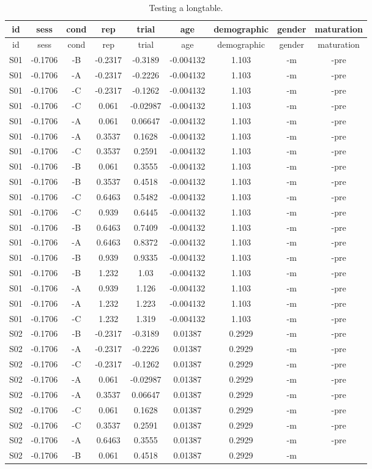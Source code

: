 \documentclass[man,longtable,noextraspace,floatsintext]{apa6}
\begin{document}
\begin{longtable}[]{@{}ccccccccc@{}}
\caption{Testing a longtable. \label{tbl:tbllong}}\tabularnewline
\toprule
id & sess & cond & rep & trial & age & demographic & gender &
maturation\tabularnewline
\midrule
\endfirsthead
\toprule
id & sess & cond & rep & trial & age & demographic & gender &
maturation\tabularnewline
\midrule
\endhead
S01 & -0.1706 & -B & -0.2317 & -0.3189 & -0.004132 & 1.103 & -m &
-pre\tabularnewline
S01 & -0.1706 & -A & -0.2317 & -0.2226 & -0.004132 & 1.103 & -m &
-pre\tabularnewline
S01 & -0.1706 & -C & -0.2317 & -0.1262 & -0.004132 & 1.103 & -m &
-pre\tabularnewline
S01 & -0.1706 & -C & 0.061 & -0.02987 & -0.004132 & 1.103 & -m &
-pre\tabularnewline
S01 & -0.1706 & -A & 0.061 & 0.06647 & -0.004132 & 1.103 & -m &
-pre\tabularnewline
S01 & -0.1706 & -A & 0.3537 & 0.1628 & -0.004132 & 1.103 & -m &
-pre\tabularnewline
S01 & -0.1706 & -C & 0.3537 & 0.2591 & -0.004132 & 1.103 & -m &
-pre\tabularnewline
S01 & -0.1706 & -B & 0.061 & 0.3555 & -0.004132 & 1.103 & -m &
-pre\tabularnewline
S01 & -0.1706 & -B & 0.3537 & 0.4518 & -0.004132 & 1.103 & -m &
-pre\tabularnewline
S01 & -0.1706 & -C & 0.6463 & 0.5482 & -0.004132 & 1.103 & -m &
-pre\tabularnewline
S01 & -0.1706 & -C & 0.939 & 0.6445 & -0.004132 & 1.103 & -m &
-pre\tabularnewline
S01 & -0.1706 & -B & 0.6463 & 0.7409 & -0.004132 & 1.103 & -m &
-pre\tabularnewline
S01 & -0.1706 & -A & 0.6463 & 0.8372 & -0.004132 & 1.103 & -m &
-pre\tabularnewline
S01 & -0.1706 & -B & 0.939 & 0.9335 & -0.004132 & 1.103 & -m &
-pre\tabularnewline
S01 & -0.1706 & -B & 1.232 & 1.03 & -0.004132 & 1.103 & -m &
-pre\tabularnewline
S01 & -0.1706 & -A & 0.939 & 1.126 & -0.004132 & 1.103 & -m &
-pre\tabularnewline
S01 & -0.1706 & -A & 1.232 & 1.223 & -0.004132 & 1.103 & -m &
-pre\tabularnewline
S01 & -0.1706 & -C & 1.232 & 1.319 & -0.004132 & 1.103 & -m &
-pre\tabularnewline
S02 & -0.1706 & -B & -0.2317 & -0.3189 & 0.01387 & 0.2929 & -m &
-pre\tabularnewline
S02 & -0.1706 & -A & -0.2317 & -0.2226 & 0.01387 & 0.2929 & -m &
-pre\tabularnewline
S02 & -0.1706 & -C & -0.2317 & -0.1262 & 0.01387 & 0.2929 & -m &
-pre\tabularnewline
S02 & -0.1706 & -A & 0.061 & -0.02987 & 0.01387 & 0.2929 & -m &
-pre\tabularnewline
S02 & -0.1706 & -A & 0.3537 & 0.06647 & 0.01387 & 0.2929 & -m &
-pre\tabularnewline
S02 & -0.1706 & -C & 0.061 & 0.1628 & 0.01387 & 0.2929 & -m &
-pre\tabularnewline
S02 & -0.1706 & -C & 0.3537 & 0.2591 & 0.01387 & 0.2929 & -m &
-pre\tabularnewline
S02 & -0.1706 & -A & 0.6463 & 0.3555 & 0.01387 & 0.2929 & -m &
-pre\tabularnewline
S02 & -0.1706 & -B & 0.061 & 0.4518 & 0.01387 & 0.2929 & -m &

\end{longtable}
\end{document}
